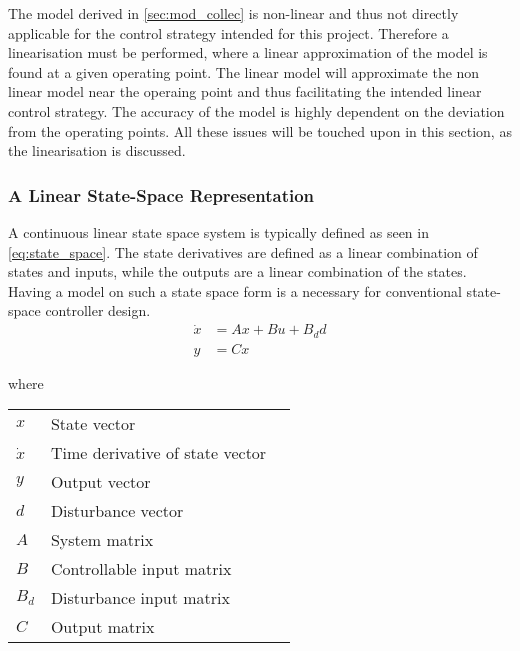 







The model derived in \cref{sec:mod_collec} is non-linear and thus not directly applicable for the control strategy intended for this project. Therefore a linearisation must be performed, where a linear approximation of the model is found at a given operating point. The linear model will approximate the non linear model near the operaing point and thus facilitating the intended linear control strategy. The accuracy of the model is highly dependent on the deviation from the operating points. All these issues will be touched upon in this section, as the linearisation is discussed.

\subsubsection{A Linear State-Space Representation}
A continuous linear state space system is typically defined as seen in \cref{eq:state_space}. The state derivatives are defined as a linear combination of states and inputs, while the outputs are a linear combination of the states. Having a model on such a state space form is a necessary for conventional state-space controller design.\\

\begin{equation} \label{eq:state_space}
	\begin{split}
		\dot{x} & = Ax + Bu + B_dd \\
		y 		& = Cx
	\end{split}
\end{equation}

where

\begin{center}
	\begin{tabular}{l p{8cm} l}
		$x$       & State vector                    &  \\
		$\dot{x}$ & Time derivative of state vector &  \\
		$y$       & Output vector                   &  \\
		$d$       & Disturbance vector              &  \\
		$A$       & System matrix                   &  \\
		$B$       & Controllable input matrix       &  \\
		$B_d$     & Disturbance input matrix        &  \\
		$C$       & Output matrix                   &
	\end{tabular}
\end{center}

